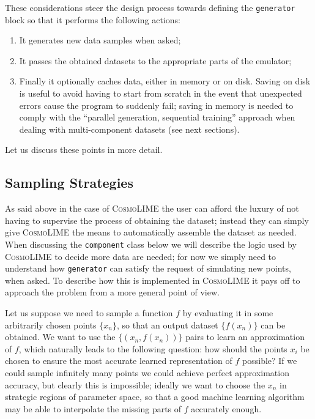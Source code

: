These considerations steer the design process towards defining the \texttt{generator} block so that it performs the following actions:
\begin{enumerate}
    \item It generates new data samples when asked;
    \item It passes the obtained datasets to the appropriate parts of the emulator;
    \item Finally it optionally caches data, either in memory or on disk. Saving on disk is useful to avoid having to start from scratch in the event that unexpected errors cause the program to suddenly fail; saving in memory is needed to comply with the ``parallel generation, sequential training'' approach when dealing with multi-component datasets (see next sections).
\end{enumerate}
Let us discuss these points in more detail.

\subsection{Sampling Strategies}\label{subsec:sampling_strategies}
As said above in the case of \textsc{CosmoLIME} the user can afford the luxury of not having to supervise the process of obtaining the dataset; instead they can simply give \textsc{CosmoLIME} the means to automatically assemble the dataset as needed. When discussing the \texttt{component} class below we will describe the logic used by \textsc{CosmoLIME} to decide more data are needed; for now we simply need to understand how \texttt{generator} can satisfy the request of simulating new points, when asked. To describe how this is implemented in \textsc{CosmoLIME} it pays off to approach the problem from a more general point of view.

Let us suppose we need to sample a function $f$ by evaluating it in some arbitrarily chosen points $\{x_n\}$, so that an output dataset $\{f(x_n)\}$ can be obtained. We want to use the $\{(x_n, f(x_n))\}$ pairs to learn an approximation of $f$, which naturally leads to the following question: how should the points $x_i$ be chosen to ensure the most accurate learned representation of $f$ possible? If we could sample infinitely many points we could achieve perfect approximation accuracy, but clearly this is impossible; ideally we want to choose the $x_n$ in strategic regions of parameter space, so that a good machine learning algorithm may be able to interpolate the missing parts of $f$ accurately enough.

